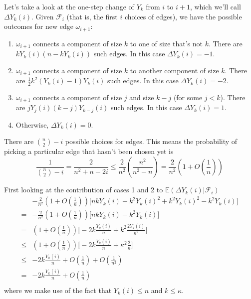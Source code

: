 Let's take a look at the one-step change of \(Y_{k}\) from \(i\) to \(i+1\), which we'll call \(\Delta Y_{k}(i)\). Given \(\mathcal{F}_{i}\) (that is, the first \(i\) choices of edges), we have the possible outcomes for new edge \(\omega_{i+1}\):
\begin{enumerate}
    \item \(\omega_{i + 1}\) connects a component of size \(k\) to one of size that's not \(k\). There are \(k Y_{k}(i) (n - k Y_{k}(i))\) such edges. In this case \(\Delta Y_{k}(i) = -1\).
    \item \(\omega_{i+1}\) connects a component of size \(k\) to another component of size \(k\). There are \(\frac{1}{2} k^{2} (Y_{k}(i) - 1) Y_{k}(i)\) such edges. In this case \(\Delta Y_{k}(i) = -2\).
    \item \(\omega_{i + 1}\) connects a component of size \(j\) and size \(k - j\) (for some \(j < k\)). There are \(j Y_{j}(i) (k - j) Y_{k-j}(i)\) such edges. In this case \(\Delta Y_{k}(i) = 1\).
    \item Otherwise,  \(\Delta Y_{k}(i) = 0\).
\end{enumerate}

There are \(\binom{n}{2} - i\) possible choices for edges. This means the probability of picking a particular edge that hasn't been chosen yet is
\[\frac{1}{\binom{n}{2} - i} = \frac{2}{n^{2} + n - 2i} \leq \frac{2}{n^{2}} \left(\frac{n^{2}}{n^{2} - n} \right) =  \frac{2}{n^{2}} \left(1 + O(\frac{1}{n})\right)\]

First looking at the contribution of cases 1 and 2 to \(\mathbb{E}(\Delta Y_{k}(i)|\mathcal{F}_{i})\)
\begin{align*}
    &-  \frac{2}{n^{2}} \left(1 + O(\frac{1}{n})\right) \Big[  n k Y_{k}(i) - k^{2} Y_{k}(i)^{2}   + k^{2} Y_{k}(i)^{2} - k^{2} Y_{k}(i)\Big] \\
    =&  -  \frac{2}{n^{2}} \left(1 + O(\frac{1}{n})\right) \Big[  n k Y_{k}(i) - k^{2} Y_{k}(i)\Big] \\
    =& \left(1 + O(\frac{1}{n})\right)  \Big[  -2 k \frac{Y_{k}(i)}{n} + k^{2} \frac{2Y_{k}(i)}{n^{2}}\Big] \\
    \leq& \left(1 + O(\frac{1}{n})\right)  \Big[  -2 k \frac{Y_{k}(i)}{n} + \kappa^{2} \frac{2}{n}\Big] \\
    \leq& -2 k \frac{Y_{k}(i)}{n} + O(\frac{1}{n}) + O(\frac{1}{n^{2}}) \\
    =& -2 k \frac{Y_{k}(i)}{n} + O(\frac{1}{n}) \\
\end{align*}
where we make use of the fact that \(Y_{k}(i) \leq n\) and \(k \leq \kappa\).


